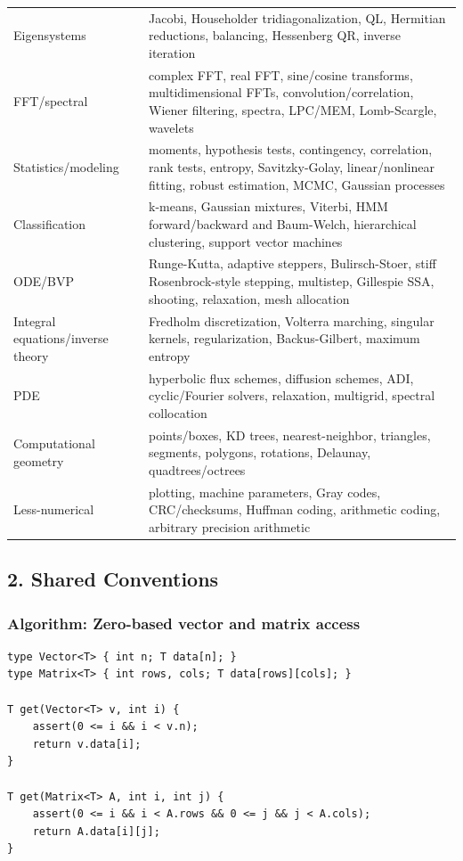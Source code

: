 \documentclass[11pt]{article}
\begin{document}
\begin{longtable}[]{@{}
  >{\raggedright\arraybackslash}p{}
  >{\raggedright\arraybackslash}p{}@{}}
Eigensystems & Jacobi, Householder tridiagonalization, QL, Hermitian reductions, balancing, Hessenberg QR, inverse iteration \\
FFT/spectral & complex FFT, real FFT, sine/cosine transforms, multidimensional FFTs, convolution/correlation, Wiener filtering, spectra, LPC/MEM, Lomb-Scargle, wavelets \\
Statistics/modeling & moments, hypothesis tests, contingency, correlation, rank tests, entropy, Savitzky-Golay, linear/nonlinear fitting, robust estimation, MCMC, Gaussian processes \\
Classification & k-means, Gaussian mixtures, Viterbi, HMM forward/backward and Baum-Welch, hierarchical clustering, support vector machines \\
ODE/BVP & Runge-Kutta, adaptive steppers, Bulirsch-Stoer, stiff Rosenbrock-style stepping, multistep, Gillespie SSA, shooting, relaxation, mesh allocation \\
Integral equations/inverse theory & Fredholm discretization, Volterra marching, singular kernels, regularization, Backus-Gilbert, maximum entropy \\
PDE & hyperbolic flux schemes, diffusion schemes, ADI, cyclic/Fourier solvers, relaxation, multigrid, spectral collocation \\
Computational geometry & points/boxes, KD trees, nearest-neighbor, triangles, segments, polygons, rotations, Delaunay, quadtrees/octrees \\
Less-numerical & plotting, machine parameters, Gray codes, CRC/checksums, Huffman coding, arithmetic coding, arbitrary precision arithmetic \\
\end{longtable}

\subsection{2. Shared Conventions}\label{shared-conventions}

\subsubsection{Algorithm: Zero-based vector and matrix access}\label{algorithm-zero-based-vector-and-matrix-access}

\begin{verbatim}
type Vector<T> { int n; T data[n]; }
type Matrix<T> { int rows, cols; T data[rows][cols]; }

T get(Vector<T> v, int i) {
    assert(0 <= i && i < v.n);
    return v.data[i];
}

T get(Matrix<T> A, int i, int j) {
    assert(0 <= i && i < A.rows && 0 <= j && j < A.cols);
    return A.data[i][j];
}
\end{verbatim}
\end{document}
